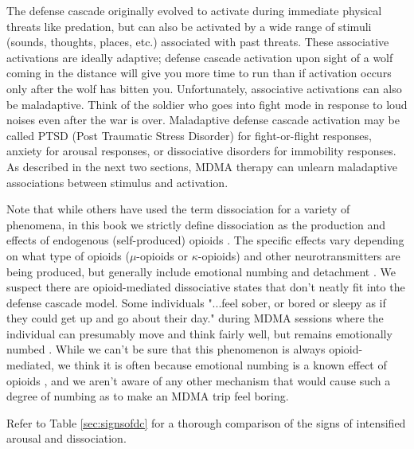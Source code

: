 \documentclass[12pt,letterpaper]{book}
\begin{document}
The defense cascade originally evolved to activate during immediate physical threats like predation, but can also be activated by a wide range of stimuli (sounds, thoughts, places, etc.) associated with past threats. These associative activations are ideally adaptive; defense cascade activation upon sight of a wolf coming in the distance will give you more time to run than if activation occurs only after the wolf has bitten you. Unfortunately, associative activations can also be maladaptive. Think of the soldier who goes into fight mode in response to loud noises even after the war is over. Maladaptive defense cascade activation may be called PTSD (Post Traumatic Stress Disorder) for fight-or-flight responses, anxiety for arousal responses, or dissociative disorders for immobility responses. As described in the next two sections, MDMA therapy can unlearn maladaptive associations between stimulus and activation.

Note that while others have used the term dissociation for a variety of phenomena, in this book we strictly define dissociation as the production and effects of endogenous (self-produced) opioids \cite{kozlowskaDefenseCascade}. The specific effects vary depending on what type of opioids ($\mu$-opioids or $\kappa$-opioids) and other neurotransmitters are being produced, but generally include emotional numbing and detachment \cite{kozlowskaDefenseCascade,lanius2018review}. We suspect there are opioid-mediated dissociative states that don't neatly fit into the defense cascade model. Some individuals "...feel sober, or bored or sleepy as if they could get up and go about their day." during MDMA sessions where the individual can presumably move and think fairly well, but remains emotionally numbed \cite{razviPSIP}. While we can't be sure that this phenomenon is always opioid-mediated, we think it is often because emotional numbing is a known effect of opioids \cite{lanius2018review}, and we aren't aware of any other mechanism that would cause such a degree of numbing as to make an MDMA trip feel boring.

Refer to Table \ref{sec:signsofdc} for a thorough comparison of the signs of intensified arousal and dissociation.
\end{document}
